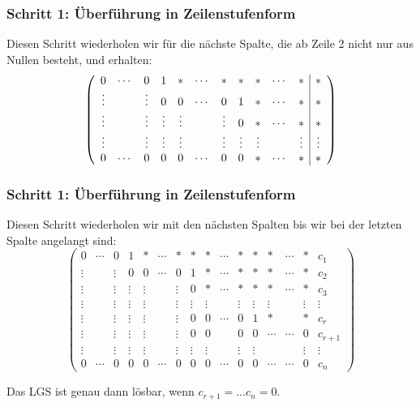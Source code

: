 %
%
\begin{frame}\frametitle{Schritt 1: \"Uberführung in Zeilenstufenform}
	
	Diesen Schritt wiederholen wir für die nächste Spalte, die ab Zeile 2 nicht nur aus Nullen besteht, und erhalten: \\[5mm]
	
	$$
		\left(
		\begin{array}{ccccccccccc | c}
			0		&\cdots 	& 0 		& 1 		& *		& \cdots 	& *		& *		& *		&  \cdots	& * 		& *\\
			\vdots 	& 		& \vdots 	& 0 		& 0		& \cdots	& 0		& 1		& * 		& \cdots 	& * 		& *\\
			\vdots 	&  		&\vdots 	& \vdots  	& \vdots    & 	   	& \vdots	& 0		& *		& \cdots	& *		& *\\
			\vdots 	&  		&\vdots 	& \vdots  	& \vdots    & 	   	& \vdots	& \vdots	& \vdots	& 		& \vdots	& \vdots\\			
			0		&\cdots 	& 0 		& 0 		& 0 		& \cdots 	& 0 		& 0		& *		& \cdots	& *		& *
		\end{array}
		\right)
	$$
	
\end{frame}
%
%
\begin{frame}\frametitle{Schritt 1: \"Uberführung in Zeilenstufenform}

	Diesen Schritt  wiederholen wir mit den nächsten Spalten bis wir bei der letzten Spalte angelangt sind:	
	$$
		\left(
		\begin{array}{ccccccccccccccc|c}
			0		&\cdots 	& 0 		& 1 		& *		& \cdots 	& *		& *		& *		&  \cdots	& *		& *		& *		& \cdots	& * 		& c_1\\
			\vdots 	& 		& \vdots 	& 0 		& 0		& \cdots	& 0		& 1		& * 		& \cdots 	& * 		& *		& *		& \cdots	& *		& c_2\\
			\vdots 	&  		&\vdots 	& \vdots  	& \vdots    & 	   	& \vdots	& 0		& *		& \cdots	& *		& *		& *		& \cdots	& *		& c_3\\			
			\vdots 	&  		&\vdots 	& \vdots  	& \vdots    & 	   	& \vdots	& \vdots	& \vdots	& 		& \vdots	& \vdots	& \vdots	&		& \vdots	& \vdots\\		
			\vdots 	&  		&\vdots 	& \vdots  	& \vdots    & 	   	& \vdots	& 0		& 0		& \cdots	& 0		& 1 		& *		&		& *		& c_r\\	
			\vdots 	&  		&\vdots 	& \vdots  	& \vdots    & 	   	& \vdots	& 0		& 0		& 		& 0		& 0		& \cdots	& \cdots	& 0		& c_{r+1}\\	
			\vdots 	&  		&\vdots 	& \vdots  	& \vdots    & 	   	& \vdots	& \vdots	& \vdots	& 		&\vdots	& \vdots	& 		& 		& \vdots	& \vdots\\				
			0		&\cdots 	& 0 		& 0 		& 0 		& \cdots 	& 0 		& 0		& 0		& \cdots	& 0		& 0		& \cdots	& \cdots	& 0		& c_n
		\end{array}
		\right)
	$$
	
	\pause
	\vspace{2mm}
	Das LGS ist genau dann lösbar, wenn $c_{r+1} = \ldots c_n = 0$.
	
\end{frame}
